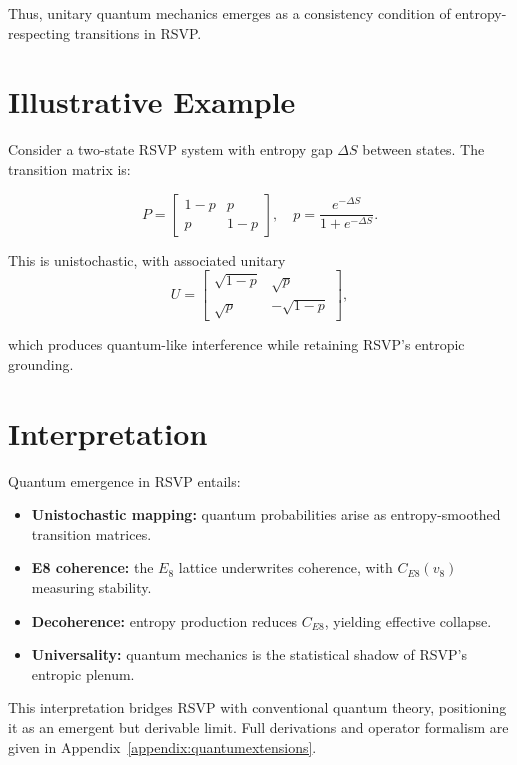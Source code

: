 \documentclass[12pt]{report}
\begin{document}
Thus, unitary quantum mechanics emerges as a consistency condition of entropy-respecting transitions in RSVP.

\section{Illustrative Example}

Consider a two-state RSVP system with entropy gap $\Delta S$ between states. The transition matrix is:

\begin{equation}
P = \begin{bmatrix}
1-p & p \\
p & 1-p
\end{bmatrix}, 
\quad p = \frac{e^{-\Delta S}}{1+e^{-\Delta S}}.
\end{equation}

This is unistochastic, with associated unitary
\begin{equation}
U = \begin{bmatrix}
\sqrt{1-p} & \sqrt{p} \\
\sqrt{p} & -\sqrt{1-p}
\end{bmatrix},
\end{equation}

which produces quantum-like interference while retaining RSVP’s entropic grounding.

\section{Interpretation}

Quantum emergence in RSVP entails:

\begin{itemize}
    \item \textbf{Unistochastic mapping:} quantum probabilities arise as entropy-smoothed transition matrices.  
    \item \textbf{E8 coherence:} the $E_8$ lattice underwrites coherence, with $C_{E8}(v_8)$ measuring stability.  
    \item \textbf{Decoherence:} entropy production reduces $C_{E8}$, yielding effective collapse.  
    \item \textbf{Universality:} quantum mechanics is the statistical shadow of RSVP’s entropic plenum.
\end{itemize}

This interpretation bridges RSVP with conventional quantum theory, positioning it as an emergent but derivable limit. Full derivations and operator formalism are given in Appendix~\ref{appendix:quantumextensions}.
\end{document}
